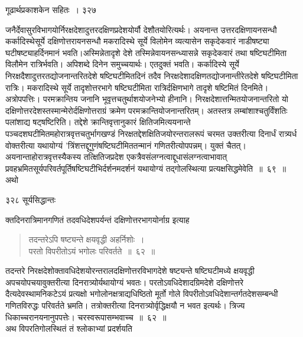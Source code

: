 \documentclass[11pt, openany]{book}
\begin{document}
\newpage

\hspace{3cm} गूढार्थप्रकाशकेन सहितः~। \hfill ३२७
\vspace{1cm}


\noindent जनैर्देवासुरविभागयोर्निरक्षदेशादुत्तरदक्षिणप्रदेशयोर्यौ देशौतयोरित्यर्थः। अयनान्त उत्तरदक्षिणायनसन्धौ कर्कादिस्थेसूर्ये दक्षिणोत्तरायनसन्धौ मकरादिस्थे सूर्ये विलोमेन व्यत्यासेन सकृदेकवारं नाडीषष्ट्या घटीषष्ट्याहर्दिनमानं भवति।अस्मिन्नेतादृशे देशे तस्मिन्नेवायनसन्ध्यासन्ने सकृदेकवारं तथा षष्टिघटीमिता विलौमेन रात्रिर्भवति। अपिशब्दे दिनेन समुच्चयार्थः। एतदुक्तं भवति। कर्कादिस्ये सूर्ये निरक्षदैशादुत्तरतद्योजनान्तरितदेशे षष्टिघटीमितदिनं तदैव निरक्षदेशादक्षिणतद्योजनान्तीरेतदेशे षष्टिघटीमिता रात्रिः। मकरादिस्थे सूर्ये तादृशोत्तरभागे षष्टिघटीमिता रात्रिर्दक्षिणभागे तादृशे षष्टिमितं दिनमिते। अत्रोपपत्तिः। परमक्रान्तिय जनानि भूवृत्तचतुर्थाशयोजनेभ्यो हीनानि। निरक्षदेशात्तन्मितयोजनान्तरितो यो दक्षिणोत्तरदेशस्तस्मान्मेरोर्दक्षिणोत्तराग्रं क्रमेण परमक्रान्तियोजनान्तरितम्। अतस्तत्र लम्बांशाश्चतुर्विंशतिः पलांशाद्य षट्षष्टिरिति। तद्देशे क्रान्तिवृत्तानुकारं क्षितिजमित्ययनान्ते पञ्चदशघटीमितमहोरात्रवृत्तचतुर्भागखण्डं निरक्षतद्देशक्षितिजयोरन्तरालरूपं चरमत उक्तरीत्या दिनार्धं रात्र्यर्ध वोक्तरीत्या यथायोग्यं 'त्रिंशत्तद्दूगुणंषष्टिघटीमिततन्मानं गणितरीत्योपपन्नम्। युक्तं चैतत्। अयनान्ताहोरात्रवृत्तस्यैकस्य तत्क्षितिजप्रदेश एकत्रैवसंलग्नत्वाद्दूधासंलग्नत्वाभावात् प्रवहभ्रमितसूर्यपरिवर्तपूर्तिषष्टिघटीभिर्दर्शनमदर्शनं यथायोग्यं तद्गोलस्थित्या प्रत्यक्षसिद्धमेवेति~॥~६९~॥ \\
अथो \textendash



\newpage


\noindent ३२८ \hspace{3cm} सूर्यसिद्धान्तः
\vspace{1cm}


\noindent क्तदिनरात्रिमानगणितं तदवधिदेशपर्यन्तं दक्षिणोत्तरभागयोर्नाग्र इत्याह \textendash


\begin{quote}
{\ssi तदन्तरेऽपि षष्ट्यन्ते क्षयवृद्धी अहर्निशोः~। \\
परतो विपरीतोऽयं भगोलः परिवर्तते~॥~६२~॥}
\end{quote}
 तदन्तरे निरक्षदेशोक्तावधिदेशयोरन्तरालदक्षिणोत्तरविभागदेशे षष्ट्यन्ते षष्टिघटीमध्ये क्षयवृद्धी अपचयोपचयावुक्तरीत्या दिनरात्र्योर्यथायोग्यं भवतः। परतोऽवधिदेशादग्रिमदेशे दक्षिणोत्तरे दैत्यदेवस्थामनिकटेऽयं प्रत्यक्षो भगोलोनक्षत्राद्यधिष्ठितो मूर्तो गोले विपरीतोऽवधिदेशान्तर्गतदेशसम्बन्धी गणितविरुद्धः परिवर्तते भ्रमति। तत्रोक्तरीत्या दिनरात्र्योर्वृद्धिक्षयौ न भवत इत्यर्थः। त्रिज्य धिकाच्चरानयनानुपपत्तेः। चरस्वरूपासम्भवाच्च~॥~६२~॥ \\
\noindent अथ विपरतिगोलस्थितं तं श्लोकाभ्यां प्रदर्शयति \textendash 
\end{document}
